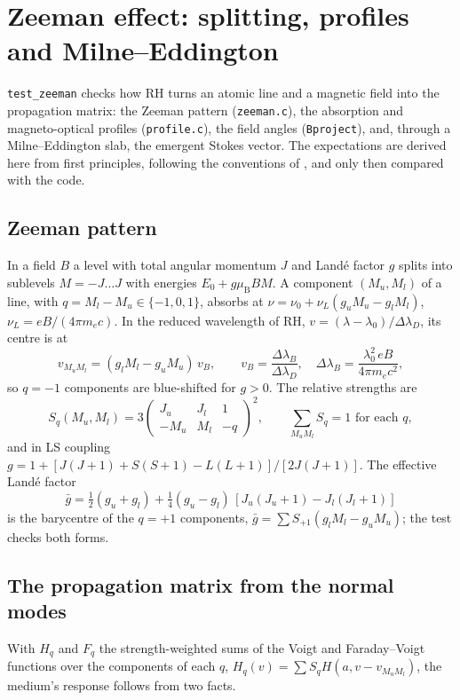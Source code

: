 \documentclass[11pt,a4paper]{article}
\newcommand{\code}[1]{\texttt{#1}}
\begin{document}
\section{Zeeman effect: splitting, profiles and Milne--Eddington}
\label{sec:zeeman}

\code{test\_zeeman} checks how RH turns an atomic line and a magnetic
field into the propagation matrix: the Zeeman pattern (\code{zeeman.c}),
the absorption and magneto-optical profiles (\code{profile.c}), the field
angles (\code{Bproject}), and, through a Milne--Eddington slab, the
emergent Stokes vector. The expectations are derived here from first
principles, following the conventions of \citet{2004ASSL..307.....L},
and only then compared with the code.

\subsection{Zeeman pattern}
In a field $B$ a level with total angular momentum $J$ and Land\'e factor
$g$ splits into sublevels $M=-J\ldots J$ with energies
$E_0+g\mu_\mathrm{B}BM$. A component $(M_u,M_l)$ of a line, with
$q = M_l-M_u\in\{-1,0,1\}$, absorbs at
$\nu = \nu_0+\nu_L(g_uM_u-g_lM_l)$, $\nu_L = eB/(4\pi m_ec)$. In the
reduced wavelength of RH, $v = (\lambda-\lambda_0)/\Delta\lambda_D$, its
centre is at
\begin{equation}
v_{M_uM_l} = (g_lM_l-g_uM_u)\,v_B,\qquad
v_B = \frac{\Delta\lambda_B}{\Delta\lambda_D},\quad
\Delta\lambda_B = \frac{\lambda_0^2\,eB}{4\pi m_ec^2},
\end{equation}
so $q=-1$ components are blue-shifted for $g>0$. The relative strengths
are
\begin{equation}
S_q(M_u,M_l) = 3\begin{pmatrix}J_u&J_l&1\\-M_u&M_l&-q\end{pmatrix}^2,
\qquad \sum_{M_uM_l}S_q = 1 \text{ for each } q,
\end{equation}
and in LS coupling $g = 1+[J(J+1)+S(S+1)-L(L+1)]/[2J(J+1)]$. The
effective Land\'e factor
\begin{equation}
\bar g = \tfrac12(g_u+g_l)+\tfrac14(g_u-g_l)\,[J_u(J_u+1)-J_l(J_l+1)]
\end{equation}
is the barycentre of the $q=+1$ components,
$\bar g = \sum S_{+1}(g_lM_l-g_uM_u)$; the test checks both forms.

\subsection{The propagation matrix from the normal modes}
With $H_q$ and $F_q$ the strength-weighted sums of the Voigt and
Faraday--Voigt functions over the components of each $q$,
$H_q(v) = \sum S_q H(a, v-v_{M_uM_l})$, the medium's response follows
from two facts.
\end{document}
